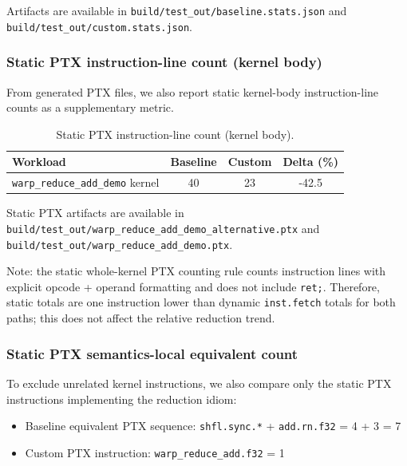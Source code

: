\documentclass[11pt]{article}
\providecommand{\tightlist}{%
  \setlength{\itemsep}{0pt}\setlength{\parskip}{0pt}}
\begin{document}
Artifacts are available in \texttt{build/test\_out/baseline.stats.json} and
\texttt{build/test\_out/custom.stats.json}.

\hypertarget{static-ptx-instruction-line-count-kernel-body}{%
\subsubsection{Static PTX instruction-line count (kernel
body)}\label{static-ptx-instruction-line-count-kernel-body}}

From generated PTX files, we also report static kernel-body
instruction-line counts as a supplementary metric.

\begin{table}[htbp]
\centering
\caption{Static PTX instruction-line count (kernel body).}
\label{tab:static-ptx-count}
\begin{tabular}{lccc}
\toprule
Workload & Baseline & Custom & Delta (\%) \\
\midrule
\texttt{warp\_reduce\_add\_demo} kernel & 40 & 23 & -42.5 \\
\bottomrule
\end{tabular}
\end{table}

Static PTX artifacts are available in
\texttt{build/test\_out/warp\_reduce\_add\_demo\_alternative.ptx} and
\texttt{build/test\_out/warp\_reduce\_add\_demo.ptx}.

Note: the static whole-kernel PTX counting rule counts instruction lines
with explicit opcode + operand formatting and does not include
\texttt{ret;}. Therefore, static totals are one instruction lower than
dynamic \texttt{inst.fetch} totals for both paths; this does not affect
the relative reduction trend.

\hypertarget{static-ptx-semantics-local-equivalent-count}{%
\subsubsection{Static PTX semantics-local equivalent
count}\label{static-ptx-semantics-local-equivalent-count}}

To exclude unrelated kernel instructions, we also compare only the
static PTX instructions implementing the reduction idiom:

\begin{itemize}
\tightlist
\item
  Baseline equivalent PTX sequence:
  \texttt{shfl.sync.*} + \texttt{add.rn.f32} = 4 + 3 = 7
\item
  Custom PTX instruction: \texttt{warp\_reduce\_add.f32} = 1
\end{itemize}
\end{document}
